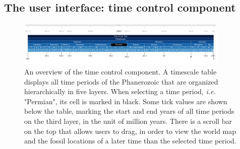 \documentclass[11pt, a4paper,oneside,chapterprefix=false]{scrbook}
\begin{document}
\subsection{The user interface: time control component}\label{subsec:tec_frontend_time}

\begin{figure}[h]
	\centering
	\includegraphics[width=0.9\textwidth]{figures/technical_solution/time_control/time_control_overview}
	\caption{An overview of the time control component. A timescale table displays all time periods of the Phanerozoic that are organized hierarchically in five layers. When selecting a time period, \emph{i.e.} "Permian", its cell is marked in black. Some tick values are shown below the table, marking the start and end years of all time periods on the third layer, in the unit of million years. There is a scroll bar on the top that allows users to drag, in order to view the world map and the fossil locations of a later time than the selected time period.}
	\label{fig:time_control_overview}
\end{figure}
\end{document}
